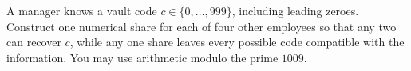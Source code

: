 A manager knows a vault code $c\in\{0,\ldots,999\}$, including leading zeroes. Construct one numerical share for each of four other employees so that any two can recover $c$, while any one share leaves every possible code compatible with the information. You may use arithmetic modulo the prime $1009$.
